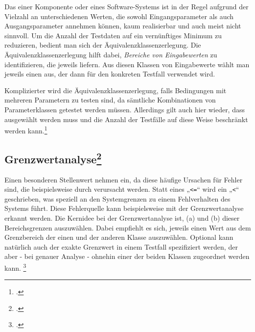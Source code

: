 \documentclass{lehramt-informatik-haupt}
\begin{document}
Das  einer Komponente oder eines
Software-Systems ist in der Regel aufgrund der Vielzahl an
unterschiedenen Werten, die sowohl Eingangsparameter als auch
Ausgangsparameter annehmen können, kaum realisierbar und auch meist
nicht sinnvoll. Um die Anzahl der Testdaten auf ein vernünftiges Minimum
zu reduzieren, bedient man sich der Äquivalenzklassenzerlegung. Die
Äquivalenzklassenzerlegung hilft dabei, \emph{Bereiche von
Eingabewerten} zu identifizieren, die jeweils  liefern. Aus diesen Klassen von Eingabewerte wählt man
jeweils einen  aus, der dann für den
konkreten Testfall verwendet wird.

Komplizierter wird die Äquivalenzklassenzerlegung, falls Bedingungen mit
mehreren Parametern zu testen sind, da sämtliche Kombinationen von
Parameterklassen getestet werden müssen. Allerdings gilt auch hier
wieder, dass  ausgewählt werden muss und die Anzahl der Testfälle auf
diese Weise beschränkt werden kann.\footcite[Seite 142]{schatten}

%

\subsection{Grenzwertanalyse\footcite[Seite 251]{schneider}}

Einen besonderen Stellenwert nehmen  ein, da diese häufige Ursachen für Fehler sind, die
beispielsweise durch  verursacht werden. Statt eines
„\texttt{<=}“ wird ein „\texttt{<}“ geschrieben, was speziell an den
Systemgrenzen zu einem Fehlverhalten des Systems führt. Diese
Fehlerquelle kann beispielsweise mit der Grenzwertanalyse erkannt
werden. Die Kernidee bei der Grenzwertanalyse ist, (a)
 und (b)  dieser Bereichsgrenzen auszuwählen. Dabei empfiehlt es
sich, jeweils einen Wert aus dem Grenzbereich der einen und der anderen
Klasse auszuwählen. Optional kann natürlich auch der exakte Grenzwert in
einem Testfall spezifiziert werden, der aber - bei genauer Analyse -
ohnehin einer der beiden Klassen zugeordnet werden kann.
\footcite[Seite 142]{schatten}

%
\end{document}
